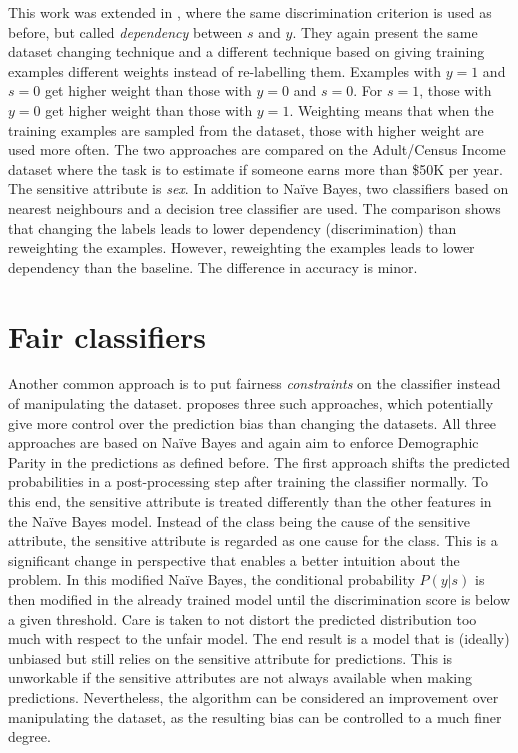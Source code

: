 This work was extended in \citet{calders2009building},
where the same discrimination criterion is used as before,
but called \emph{dependency} between \(s\) and \(y\).
They again present the same dataset changing technique
and a different technique based on giving training examples different weights
instead of re-labelling them.
Examples with \(y=1\) and \(s=0\) get higher weight than those with \(y=0\) and \(s=0\).
For \(s=1\), those with \(y=0\) get higher weight than those with \(y=1\).
Weighting means that when the training examples are sampled from the dataset,
those with higher weight are used more often.
The two approaches are compared on the Adult/Census Income dataset \citep{kohavi1996scaling}
where the task is to estimate if someone earns more than \$50K per year.
The sensitive attribute is \emph{sex}.
In addition to Na\"ive Bayes,
two classifiers based on nearest neighbours and a decision tree classifier are used.
The comparison shows that changing the labels leads to lower dependency (discrimination)
than reweighting the examples.
However, reweighting the examples leads to lower dependency than the baseline.
The difference in accuracy is minor.

\section{Fair classifiers}\label{fair-classifiers}
Another common approach is to put fairness \emph{constraints} on the classifier
instead of manipulating the dataset.
\citet{calders2010three} proposes three such approaches,
which potentially give more control over the prediction bias than changing the datasets.
All three approaches are based on Na\"ive Bayes
and again aim to enforce Demographic Parity in the predictions as defined before.
The first approach shifts the predicted probabilities in a post-processing step
after training the classifier normally.
To this end, the sensitive attribute is treated differently
than the other features in the Na\"ive Bayes model.
Instead of the class being the cause of the sensitive attribute,
the sensitive attribute is regarded as one cause for the class.
This is a significant change in perspective that enables a better intuition about the problem.
In this modified Na\"ive Bayes,
the conditional probability \(P(y|s)\) is then modified in the already trained model
until the discrimination score is below a given threshold.
Care is taken to not distort the predicted distribution too much with respect to the unfair model.
The end result is a model that is (ideally) unbiased
but still relies on the sensitive attribute for predictions.
This is unworkable if the sensitive attributes are not always available when making predictions.
Nevertheless, the algorithm can be considered an improvement over manipulating the dataset,
as the resulting bias can be controlled to a much finer degree.

